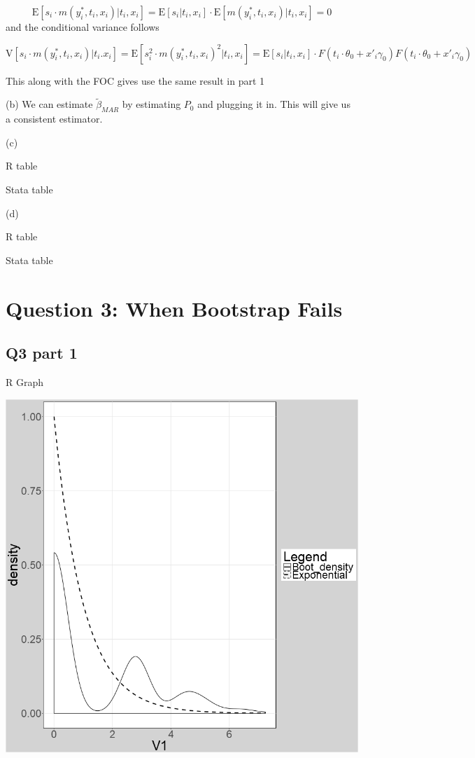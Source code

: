 \documentclass[11pt]{article}
\newcommand{\E}{\mathrm{E}}
\newcommand{\V}{\mathrm{V}}
\begin{document}
$$ 
\E[s_i \cdot m(y_i^*, t_i, x_i)|t_i, x_i] = \E[s_i|t_i,x_i] \cdot \E[m(y_i^*, t_i, x_i)|t_i, x_i] =0$$
and the conditional variance follows

$$
\V[s_i \cdot m(y_i^*, t_i, x_i)|t_i. x_i] = \E[s_i^2 \cdot m(y_i^*, t_i, x_i)^2 |t_i, x_i]  = \E[s_i|t_i, x_i] \cdot F(t_i \cdot \theta_0 + x'_i \gamma_0)F(t_i \cdot \theta_0 + x'_i \gamma_0)
$$

This along with the FOC gives use the same result in part 1 


(b) We can estimate $\tilde{\beta}_{MAR}$ by estimating $P_0$ and plugging it in. This will give us a consistent estimator. 

(c)

	\centerline{R table }
\begin{center}
	
\end{center}

	\centerline{Stata table }
\begin{center}
	
\end{center}


(d)

	\centerline{R table }
\begin{center}
	
\end{center}

	\centerline{Stata table }
\begin{center}
	
\end{center}


\section{Question 3: When Bootstrap Fails}
\subsection{Q3 part 1}
\centerline{R Graph }
\begin{center}
	\includegraphics[width=.8\linewidth]{plot_q3_1.png}	
\end{center}
\end{document}
